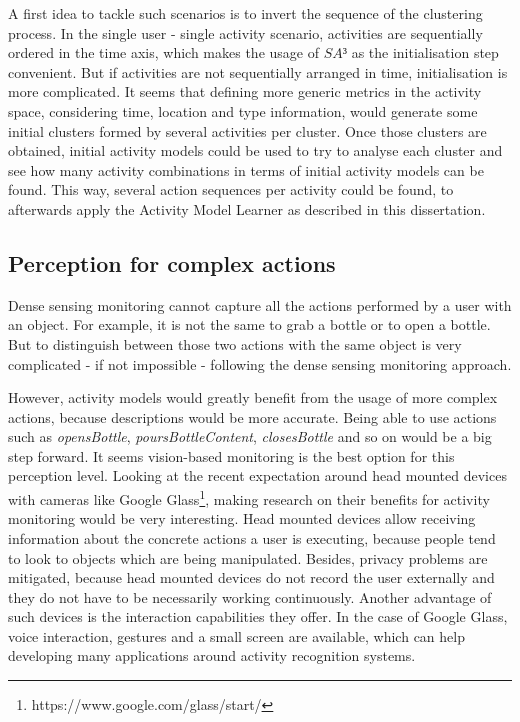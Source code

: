A first idea to tackle such scenarios is to invert the sequence of the clustering process. In the single user - single activity scenario, activities are sequentially ordered in the time axis, which makes the usage of $SA³$ as the initialisation step convenient. But if activities are not sequentially arranged in time, initialisation is more complicated. It seems that defining more generic metrics in the activity space, considering time, location and type information, would generate some initial clusters formed by several activities per cluster. Once those clusters are obtained, initial activity models could be used to try to analyse each cluster and see how many activity combinations in terms of initial activity models can be found. This way, several action sequences per activity could be found, to afterwards apply the Activity Model Learner as described in this dissertation.

\subsection{Perception for complex actions}

Dense sensing monitoring cannot capture all the actions performed by a user with an object. For example, it is not the same to grab a bottle or to open a bottle. But to distinguish between those two actions with the same object is very complicated - if not impossible - following the dense sensing monitoring approach.

However, activity models would greatly benefit from the usage of more complex actions, because descriptions would be more accurate. Being able to use actions such as \textit{opensBottle}, \textit{poursBottleContent}, \textit{closesBottle} and so on would be a big step forward. It seems vision-based monitoring is the best option for this perception level. Looking at the recent expectation around head mounted devices with cameras like Google Glass\footnote{https://www.google.com/glass/start/}, making research on their benefits for activity monitoring would be very interesting. Head mounted devices allow receiving information about the concrete actions a user is executing, because people tend to look to objects which are being manipulated. Besides, privacy problems are mitigated, because head mounted devices do not record the user externally and they do not have to be necessarily working continuously. Another advantage of such devices is the interaction capabilities they offer. In the case of Google Glass, voice interaction, gestures and a small screen are available, which can help developing many applications around activity recognition systems.

